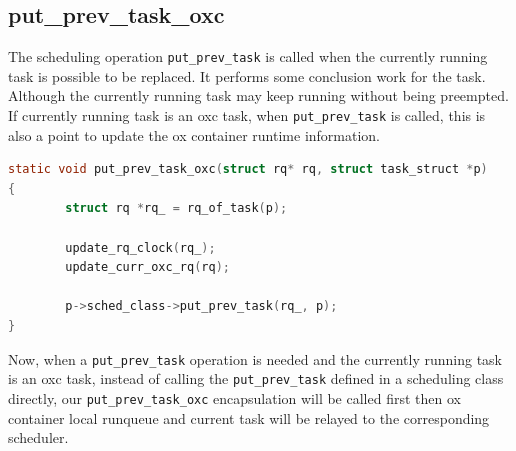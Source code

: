\subsection{put\_prev\_task\_oxc}
The scheduling operation \texttt{put\_prev\_task} is called when the 
currently running task is possible to be replaced. It performs some 
conclusion work for the task. Although the currently running task may 
keep running without being preempted. If currently running task is an 
oxc task, when \texttt{put\_prev\_task} is called, this is also a point 
to update the ox container runtime information. 
\begin{lstlisting}[language=C, label={list:put_prev},
		caption={Conclusion work before an oxc task is switched 
				out of a CPU}]
static void put_prev_task_oxc(struct rq* rq, struct task_struct *p)
{
        struct rq *rq_ = rq_of_task(p);

        update_rq_clock(rq_);
        update_curr_oxc_rq(rq);

        p->sched_class->put_prev_task(rq_, p);
}
\end{lstlisting}
Now, when a \texttt{put\_prev\_task} operation is needed and the
currently running task is an oxc task, instead of calling the 
\texttt{put\_prev\_task} defined in a scheduling class directly, our
\texttt{put\_prev\_task\_oxc} encapsulation will be called first then
ox container local runqueue and current task will be relayed to
the corresponding scheduler.

